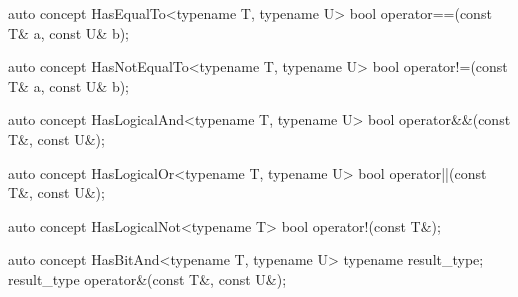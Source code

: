 \documentclass[american,twoside]{book}
\begin{document}
\begin{itemdecl}
auto concept HasEqualTo<typename T, typename U> {
  bool operator==(const T& a, const U& b);
}
\end{itemdecl}

\begin{itemdescr}
\pnum
{}
\end{itemdescr}

\begin{itemdecl}
auto concept HasNotEqualTo<typename T, typename U> {
  bool operator!=(const T& a, const U& b);
}
\end{itemdecl}

\begin{itemdescr}
\pnum
{}
\end{itemdescr}

\begin{itemdecl}
auto concept HasLogicalAnd<typename T, typename U> {
  bool operator&&(const T&, const U&);
}
\end{itemdecl}

\begin{itemdescr}
\pnum
{}
\end{itemdescr}

\begin{itemdecl}
auto concept HasLogicalOr<typename T, typename U> {
  bool operator||(const T&, const U&);
}
\end{itemdecl}

\begin{itemdescr}
\pnum
{}
\end{itemdescr}

\begin{itemdecl}
auto concept HasLogicalNot<typename T> {
  bool operator!(const T&);
}
\end{itemdecl}

\begin{itemdescr}
\pnum
{}
\end{itemdescr}

\begin{itemdecl}
auto concept HasBitAnd<typename T, typename U> {
  typename result_type;
  result_type operator&(const T&, const U&);
}
\end{itemdecl}
\end{document}
